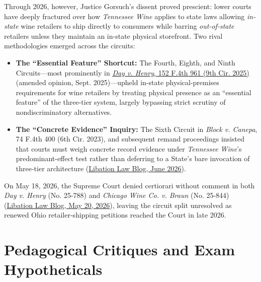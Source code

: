 \documentclass[12pt]{article}
\begin{document}
Through 2026, however, Justice Gorsuch's dissent proved prescient: lower courts have deeply fractured over how \textit{Tennessee Wine} applies to state laws allowing \textit{in-state} wine retailers to ship directly to consumers while barring \textit{out-of-state} retailers unless they maintain an in-state physical storefront. Two rival methodologies emerged across the circuits:
\begin{itemize}
    \item \textbf{The ``Essential Feature'' Shortcut:} The Fourth, Eighth, and Ninth Circuits---most prominently in \href{https://law.justia.com/cases/federal/appellate-courts/ca9/23-16148/23-16148-2025-03-04.html}{\textit{Day v. Henry}, 152 F.4th 961 (9th Cir. 2025)} (amended opinion, Sept. 2025)---upheld in-state physical-premises requirements for wine retailers by treating physical presence as an ``essential feature'' of the three-tier system, largely bypassing strict scrutiny of nondiscriminatory alternatives.
    \item \textbf{The ``Concrete Evidence'' Inquiry:} The Sixth Circuit in \textit{Block v. Canepa}, 74 F.4th 400 (6th Cir. 2023), and subsequent remand proceedings insisted that courts must weigh concrete record evidence under \textit{Tennessee Wine}'s predominant-effect test rather than deferring to a State's bare invocation of three-tier architecture (\href{https://libationlawblog.com/2026/06/24/ohio-wine-shipping-supreme-court-cert-petition/}{Libation Law Blog, June 2026}).
\end{itemize}
On May 18, 2026, the Supreme Court denied certiorari without comment in both \textit{Day v. Henry} (No. 25-788) and \textit{Chicago Wine Co. v. Braun} (No. 25-844) (\href{https://libationlawblog.com/2026/05/20/supreme-court-denies-cert-day-henry-chicago-wine-braun-retailer-shipping/}{Libation Law Blog, May 20, 2026}), leaving the circuit split unresolved as renewed Ohio retailer-shipping petitions reached the Court in late 2026.

\section{Pedagogical Critiques and Exam Hypotheticals}
\end{document}

